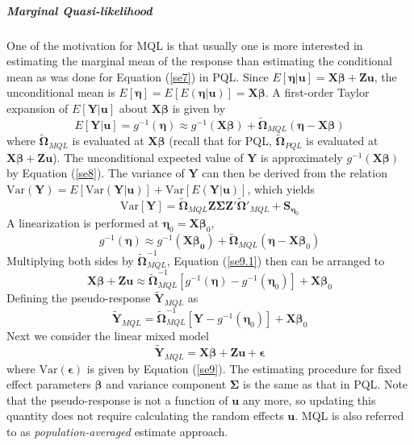 \subparagraph*{Marginal Quasi-likelihood} 
One of the motivation for MQL is that usually one is more interested in estimating the marginal
mean of the response than estimating the conditional mean as was done for Equation (\ref{se7}) in
PQL. Since $E[\bm \eta|\bm u]= \bm {X\beta} + \bm {Zu}$, the unconditional mean is $E[\bm \eta] =
E[E(\bm \eta|\bm u)]= \bm {X\beta}$. A first-order Taylor expansion of $E[\bm Y|\bm u]$ about $\bm X
\bm\beta$ is given by 
\begin{equation}\label{se8}
E[\bm Y|\bm u] = g^{-1}(\bm \eta) \approx g^{-1} (\bm{X\beta}) + \tilde{\bm \Omega}_{MQL} (\bm
\eta - \bm X\bm \beta)
\end{equation}
where $\tilde{\bm \Omega}_{MQL}$ is evaluated at $\bm {X\beta}$ (recall that for PQL, $\tilde{\bm
	\Omega}_{PQL}$ is evaluated at $\bm {X\beta} + \bm {Zu}$). The unconditional expected value of 
$\bm
Y$ is approximately $g^{-1}(\bm {X\beta})$ by Equation (\ref{se8}). The variance of $\bm Y$ can then
be derived from the relation $\text{Var}(\bm Y)= E[\text{Var}(\bm Y|\bm u)] + \text{Var}[E(\bm Y|
\bm u)]$, which yields
\begin{equation}\label{se9}
\text{Var}[\bm Y] = \tilde{\bm \Omega}_{MQL} \bm {Z\Sigma Z'}\tilde{\bm \Omega}'_{MQL} + \bm
S_{\bm \eta_0}
\end{equation}
A linearization is performed at $\bm \eta_0= \bm X \bm \beta_0$, 
\begin{equation}\label{se9.1}
g^{-1}(\bm \eta) \approx g^{-1} (\bm{X\beta_0}) + \tilde{\bm \Omega}_{MQL} (\bm \eta - \bm X\bm
\beta_0)
\end{equation}
Multiplying both sides by $\tilde{\bm \Omega}_{MQL} ^{-1}$, Equation (\ref{se9.1}) then can be
arranged to 
\[\bm {X\beta} + \bm {Zu} \approx \tilde{\bm \Omega}_{MQL}^{-1}[g^{-1}(\bm\eta)- g^{-1}(\bm
\eta_0)]  + \bm{X}\bm \beta_0 \]
Defining the pseudo-response $\tilde{\bm Y}_{MQL}$ as
\begin{equation}\label{se10}
\tilde{\bm Y}_{MQL} =  \tilde{\bm \Omega}_{MQL}^{-1}[\bm Y- g^{-1}(\bm \eta_0)]  + \bm{X}\bm
\beta_0 
\end{equation}
Next we consider the linear mixed model 
\[ \tilde{\bm Y}_{MQL}  = \bm {X\beta}+ \bm {Zu}  + \bm \epsilon\] 
where $\text{Var}(\bm \epsilon) $ is given by Equation (\ref{se9}).  The estimating procedure for
fixed effect parameters $\bm \beta$ and variance component $\bm \Sigma$ is the same as that in PQL.
Note that the pseudo-response is not a function of $\bm u$ any more, so updating this quantity does
not require calculating the random effects $\bm u$. MQL is also referred to as
\textit{population-averaged} estimate approach.

